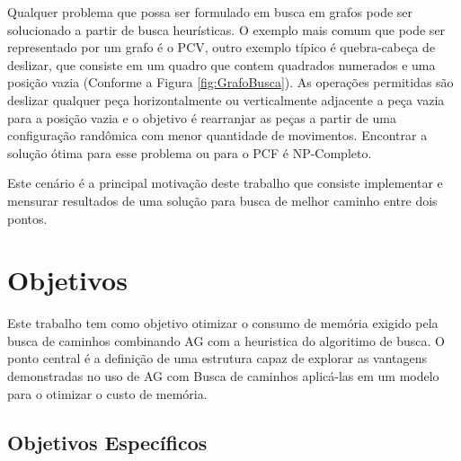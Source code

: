 Qualquer problema que possa ser formulado em busca em grafos pode ser solucionado a partir de busca heurísticas. O exemplo mais comum que pode ser representado por um grafo é o PCV, outro exemplo típico é quebra-cabeça de deslizar, que consiste em um quadro que contem quadrados numerados e uma posição vazia (Conforme a Figura \ref{fig:GrafoBusca}). As operações permitidas são deslizar qualquer peça horizontalmente ou verticalmente adjacente a peça vazia para a posição vazia e o objetivo é rearranjar as peças a partir de uma configuração randômica com menor quantidade de movimentos. Encontrar a solução ótima para esse problema ou para o PCF é NP-Completo. \cite{Kar72} \cite{RatnerW86}

\begin{minipage}{\linewidth}
    \label{fig:slide-puzzle}
\end{minipage}

Este cenário é a principal motivação deste trabalho que consiste implementar e mensurar resultados de uma solução para busca de melhor caminho entre dois pontos.

\section{Objetivos}

Este trabalho tem como objetivo otimizar o consumo de memória exigido pela busca de caminhos combinando AG com a heuristica do algoritimo de busca. O ponto central é a definição de uma estrutura capaz de explorar as vantagens demonstradas no uso de AG com Busca de caminhos \cite{Burchardt}\cite{UlyssesTCC} aplicá-las em um modelo para o otimizar o custo de memória.

\subsection{Objetivos Específicos}

